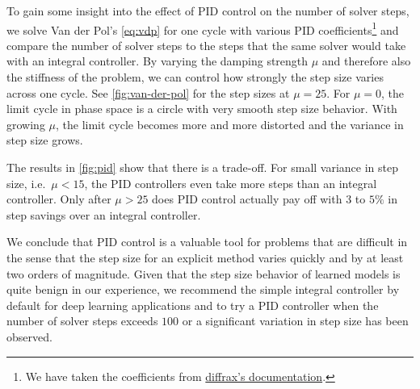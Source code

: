 \documentclass{article}
\begin{document}
To gain some insight into the effect of PID control on the number of solver steps, we solve Van der Pol's \cref{eq:vdp} for one cycle with various PID coefficients\footnote{We have taken the coefficients from \href{https://docs.kidger.site/diffrax/api/stepsize_controller/\#diffrax.PIDController}{diffrax's documentation}.} and compare the number of solver steps to the steps that the same solver would take with an integral controller. By varying the damping strength $\mu$ and therefore also the stiffness of the problem, we can control how strongly the step size varies across one cycle. See \cref{fig:van-der-pol} for the step sizes at $\mu = 25$. For $\mu = 0$, the limit cycle in phase space is a circle with very smooth step size behavior. With growing $\mu$, the limit cycle becomes more and more distorted and the variance in step size grows.

The results in \cref{fig:pid} show that there is a trade-off. For small variance in step size, i.e.\ $\mu < 15$, the PID controllers even take more steps than an integral controller. Only after $\mu > 25$ does PID control actually pay off with $3$ to $5\%$ in step savings over an integral controller.

We conclude that PID control is a valuable tool for \ODE{} problems that are difficult in the sense that the step size for an explicit method varies quickly and by at least two orders of magnitude. Given that the step size behavior of learned \ODE{} models is quite benign in our experience, we recommend the simple integral controller by default for deep learning applications and to try a PID controller when the number of solver steps exceeds $100$ or a significant variation in step size has been observed.
\end{document}
